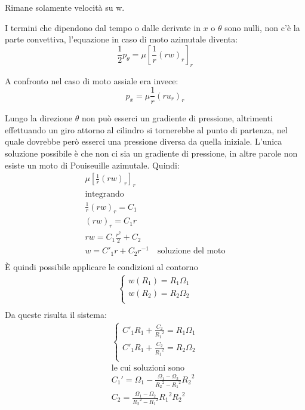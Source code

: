 Rimane solamente velocità su w.

I termini che dipendono dal tempo o dalle derivate in $x$ o $\theta$ sono nulli, non c'è la parte convettiva, l'equazione in caso di moto azimutale diventa:
%
	\begin{equation*}
		\frac{1}{2} p_{\theta} = \mu {\left[ \frac{1}{r} {(rw)}_r \right]}_r
	\end{equation*}
%

A confronto nel caso di moto assiale era invece:
%
	\begin{equation*}
		p_x = \mu \frac{1}{r} {(r u_r)}_r
	\end{equation*}
%

Lungo la direzione $\theta$ non può esserci un gradiente di pressione, altrimenti effettuando un giro attorno al cilindro si tornerebbe al punto di partenza, nel quale dovrebbe però esserci una pressione diversa da quella iniziale. 
L'unica soluzione possibile è che non ci sia un gradiente di pressione, in altre parole non esiste un moto di Pouiseuille azimutale.
Quindi:
%
	\begin{equation*}
		\begin{gathered}
			\mu {\left[ \frac{1}{r} {(r w)}_r\right]}_r\\
			\text{integrando}\\
			\frac{1}{r} {(rw)}_r = C_1\\
			{(rw)}_r = C_1 r\\
			rw = C_1 \frac{r^2}{2} + C_2\\
			w = {C'}_1 r + C_2 r^{-1} \quad \text{soluzione del moto}\\
		\end{gathered}
	\end{equation*}
%			
È quindi possibile applicare le condizioni al contorno		
%
	\begin{equation*}
		\begin{gathered}
			\left\{
				\begin{aligned}
					w(R_1) = R_1 {\Omega}_1\\
					w(R_2) = R_2 {\Omega}_2\\
				\end{aligned}
			\right.\\
		\end{gathered}
	\end{equation*}
%
Da queste risulta il sistema:			
%
	\begin{equation*}
		\begin{gathered}			
			\left\{
				\begin{aligned}
					C'_1 R_1 + \frac{C_2}{{R_1}^2} = R_1 {\Omega}_1\\
					C'_1 R_1 + \frac{C_2}{{R_1}^2} = R_2 {\Omega}_2\\
				\end{aligned}
			\right. \\
			\text{le cui soluzioni sono}\\
			{C_1}' = {\Omega}_1 - \frac{{\Omega}_1 - {\Omega}_2}{{R_2}^2 - {R_1}^2}  {R_2}^2\\
			C_2 = \frac{{\Omega}_1 - {\Omega}_2}{{R_2}^2 - {R_1}^2} {R_1}^2 {R_2}^2 \\
		\end{gathered}
	\end{equation*}
